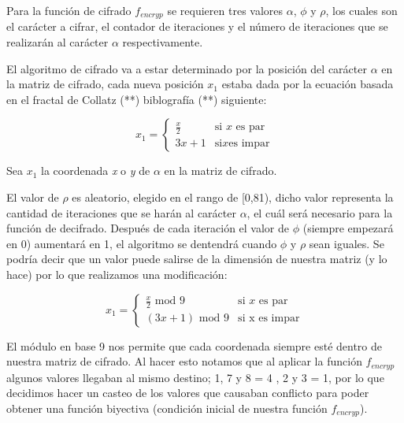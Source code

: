 Para la funci\'on de cifrado $f_{encryp}$ se requieren tres valores $\alpha$, $\phi$ y $\rho$, los cuales son el car\'acter a cifrar, el contador de iteraciones y el n\'umero de iteraciones que se realizar\'an al car\'acter $\alpha$ 
respectivamente.

El algoritmo de cifrado va a estar determinado por la posici\'on del car\'acter $\alpha$ en la matriz de cifrado, cada nueva posici\'on $x_{1}$ estaba dada por la ecuaci\'on basada en el fractal de Collatz (**) biblograf\'ia (**) siguiente:

\[ x_{1} = 
\begin{cases} 
	\frac{x}{2} & \text {si } x \text { es par} \\ 
	3x+1 & \text {si} x \text {es impar} 
\end{cases} 
\] 

Sea $x_{1}$ la coordenada \emph{x} o \emph{y} de $\alpha$ en la matriz de cifrado.

El valor de $\rho$ es aleatorio, elegido en el rango de [0,81), dicho valor representa la cantidad de iteraciones que se har\'an al car\'acter $\alpha$, el cu\'al ser\'a necesario para la funci\'on de decifrado.
Despu\'es de cada iteraci\'on el valor de $\phi$ (siempre empezar\'a en 0) aumentar\'a en 1, el algoritmo se dentendr\'a cuando $\phi$ y $\rho$ sean iguales.
Se podr\'ia decir que un valor puede salirse de la dimensi\'on de nuestra matriz (y lo hace) por lo que realizamos una modificaci\'on: 

\[ x_{1} = 
\begin{cases} 
	\frac{x}{2} \text { mod  9} & \text {si } x \text { es par} \\ 
	(3x+1) \text { mod 9} & \text {si  x} \text { es impar} 
\end{cases} 
\] 
  

El m\'odulo en base 9 nos permite que cada coordenada siempre est\'e dentro de nuestra matriz de cifrado.
Al hacer esto notamos que al aplicar la funci\'on $f_{encryp}$ algunos valores llegaban al mismo destino; 1, 7 y 8 = 4 , 2 y 3 = 1, por lo que decidimos hacer un casteo de los valores que causaban conflicto para poder obtener una funci\'on biyectiva (condici\'on inicial de nuestra funci\'on $f_{encryp}$).
